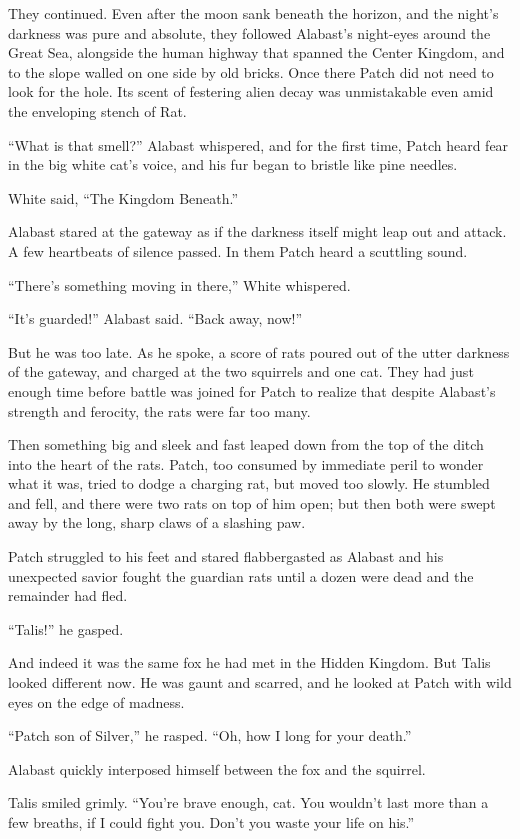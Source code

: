 \documentclass[12pt]{memoir}
\begin{document}
They continued. Even after the moon sank beneath the horizon, and the
night’s darkness was pure and absolute, they followed Alabast’s
night-eyes around the Great Sea, alongside the human highway that
spanned the Center Kingdom, and to the slope walled on one side by old
bricks. Once there Patch did not need to look for the hole. Its scent
of festering alien decay was unmistakable even amid the enveloping
stench of Rat.

“What is that smell?” Alabast whispered, and for the first time, Patch
heard fear in the big white cat’s voice, and his fur began to bristle
like pine needles.

White said, “The Kingdom Beneath.”

Alabast stared at the gateway as if the darkness itself might leap out
and attack. A few heartbeats of silence passed. In them Patch heard a
scuttling sound.

“There’s something moving in there,” White whispered.

“It’s guarded!” Alabast said. “Back away, now!”

But he was too late. As he spoke, a score of rats poured out of the
utter darkness of the gateway, and charged at the two squirrels and
one cat. They had just enough time before battle was joined for Patch
to realize that despite Alabast’s strength and ferocity, the rats were
far too many.

Then something big and sleek and fast leaped down from the top of the
ditch into the heart of the rats. Patch, too consumed by immediate
peril to wonder what it was, tried to dodge a charging rat, but moved
too slowly. He stumbled and fell, and there were two rats on top of
him open; but then both were swept away by the long, sharp claws of a
slashing paw.

Patch struggled to his feet and stared flabbergasted as Alabast and
his unexpected savior fought the guardian rats until a dozen were dead
and the remainder had fled.

“Talis!” he gasped.

And indeed it was the same fox he had met in the Hidden Kingdom. But
Talis looked different now. He was gaunt and scarred, and he looked at
Patch with wild eyes on the edge of madness.

“Patch son of Silver,” he rasped. “Oh, how I long for your death.”

Alabast quickly interposed himself between the fox and the squirrel.

Talis smiled grimly. “You’re brave enough, cat. You wouldn’t last more
than a few breaths, if I could fight you. Don’t you waste your life on
his.”
\end{document}

